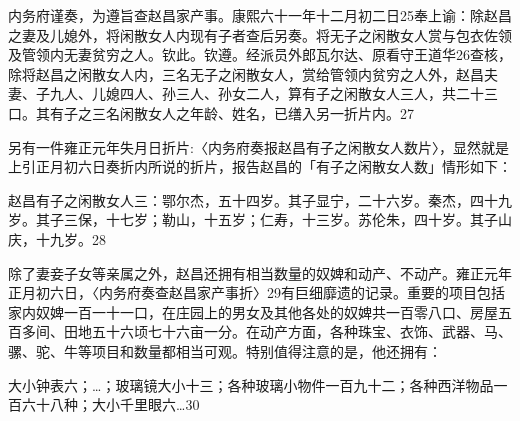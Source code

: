 \begin{BookQuote}
内务府谨奏，为遵旨查赵昌家产事。康熙六十一年十二月初二日25奉上谕：除赵昌之妻及儿媳外，将闲散女人内现有子者查后另奏。将无子之闲散女人赏与包衣佐领及管领内无妻贫穷之人。钦此。钦遵。经派员外郎瓦尔达、原看守王道华26查核，除将赵昌之闲散女人内，三名无子之闲散女人，赏给管领内贫穷之人外，赵昌夫妻、子九人、儿媳四人、孙三人、孙女二人，算有子之闲散女人三人，共二十三口。其有子之三名闲散女人之年龄、姓名，已缮入另一折片内。27
\end{BookQuote}

另有一件雍正元年失月日折片:〈内务府奏报赵昌有子之闲散女人数片〉，显然就是上引正月初六日奏折内所说的折片，报告赵昌的「有子之闲散女人数」情形如下：

\begin{BookQuote}
赵昌有子之闲散女人三：鄂尔杰，五十四岁。其子显宁，二十六岁。秦杰，四十九岁。其子三保，十七岁；勒山，十五岁；仁寿，十三岁。苏伦朱，四十岁。其子山庆，十九岁。28
\end{BookQuote}

除了妻妾子女等亲属之外，赵昌还拥有相当数量的奴婢和动产、不动产。雍正元年正月初六日，〈内务府奏查赵昌家产事折〉29有巨细靡遗的记录。重要的项目包括家内奴婢一百一十一口，在庄园上的男女及其他各处的奴婢共一百零八口、房屋五百多间、田地五十六顷七十六亩一分。在动产方面，各种珠宝、衣饰、武器、马、骡、驼、牛等项目和数量都相当可观。特别值得注意的是，他还拥有：

\vfill
\begin{BookNotes}
\end{BookNotes}

\begin{BookQuote}
大小钟表六；…；玻璃镜大小十三；各种玻璃小物件一百九十二；各种西洋物品一百六十八种；大小千里眼六…30
\end{BookQuote}

